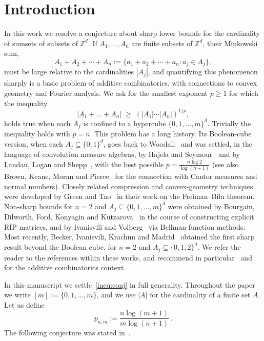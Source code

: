 \documentclass[a4paper,reqno,12pt]{amsart}
\newcommand{\z}{\mathbb{Z}}
\newcommand{\1}{\bo{1}}
\begin{document}
\section{Introduction}
In this work we resolve a conjecture about sharp lower bounds for the cardinality of sumsets of subsets of $\z^d$. If $A_1,\dots,A_n$ are finite subsets of $\z^d$, their Minkowski sum,
	$$
	A_1+A_2+\cdots + A_n :=\{a_1+a_2+\cdots+a_n :a_j\in A_j\},
	$$
must be large relative to the cardinalities $|A_j|$, and quantifying this
phenomenon sharply is a basic problem of additive combinatorics, with connections to convex geometry and Fourier analysis. We ask for the smallest exponent $p\geq 1$ for which the inequality
	\begin{equation}\label{ineq:conj}
	|A_1+\dots+A_n|\;\geq\;(|A_1|\cdots|A_n|)^{1/p},
	\end{equation}
holds true when each $A_j$ is confined to a hypercube $\{0,1,\dots,m\}^d$. Trivially the inequality holds with $p=n$. This problem has a long history. Its Boolean-cube version, when each $A_j\subseteq \{0,1\}^d$, goes back to Woodall~\cite{wo} and was settled, in the language of convolution measure algebras, by Hajela and Seymour~\cite{Ha} and by Landau, Logan and
Shepp~\cite{La-Lo-Sh}, with the best possible $p=\frac{n\log 2}{\log(n+1)}$ (see also Brown, Keane, Moran and Pierce~\cite{Br-Ke-Mo-Pi}
for the connection with Cantor measures and normal numbers). Closely related
compression and convex-geometry techniques were developed by Green and
Tao~\cite{Gr-Ta} in their work on the Freiman--Bilu theorem. Non-sharp bounds
for $n=2$ and $A_j\subseteq \{0,1,\ldots,m\}^d$ were obtained by Bourgain, Dilworth, Ford, Konyagin and Kutzarova~\cite{Bo-Di-Fo-Ko-Ku} in the course of constructing explicit RIP
matrices, and by Ivanisvili and Volberg~\cite{IvaVo} via Bellman-function
methods. Most recently, Becker, Ivanisvili, Krachun and
Madrid~\cite{Be-Iv-Kr-Ma} obtained the first sharp result beyond the Boolean
cube, for $n=2$ and $A_j\subseteq \{0,1,2\}^d$. We refer the reader to the references within these works, and recommend in particular~\cite[Appendix B]{Gr} and~\cite{TaoVu} for the additive combinatorics context.

In this manuscript we settle~\eqref{ineq:conj} in full generality. Throughout the paper
we write $[m]:=\{0,1,\ldots,m\}$, and we use $|A|$ for the cardinality of a finite set $A$. Let us define
	\begin{equation}\label{eq:pdef-intro}
	p_{n,m}:=\frac{n\log (m+1)}{m\log(n+1)}\,.
	\end{equation}
The following conjecture was stated in~\cite{Be-Iv-Kr-Ma}.
\end{document}
